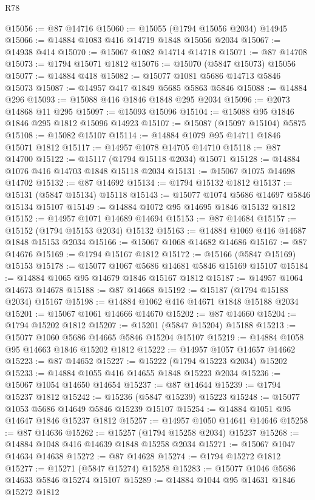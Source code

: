 \begin{lexlean}{R78}
\begin{coremodule}
@15056 := @87 @14716
@15060 := @15055 (@1794 @15056 @2034) @14945
@15066 := @14884 @1083 @416 @14719 @1848 @15056 @2034
@15067 := @14938 @414
@15070 := @15067 @1082 @14714 @14718
@15071 := @87 @14708
@15073 := @1794 @15071 @1812
@15076 := @15070 (@5847 @15073) @15056
@15077 := @14884 @418
@15082 := @15077 @1081 @5686 @14713 @5846 @15073
@15087 := @14957 @417 @1849 @5685 @5863 @5846
@15088 := @14884 @296
@15093 := @15088 @416 @1846 @1848 @295 @2034
@15096 := @2073 @14868 @11 @295
@15097 := @15093 @15096
@15104 := @15088 @95 @1846 @1846 @295 @1812 @15096 @14923
@15107 := @15087 (@15097 @15104) @5875
@15108 := @15082 @15107
@15114 := @14884 @1079 @95 @14711 @1846 @15071 @1812
@15117 := @14957 @1078 @14705 @14710
@15118 := @87 @14700
@15122 := @15117 (@1794 @15118 @2034) @15071
@15128 := @14884 @1076 @416 @14703 @1848 @15118 @2034
@15131 := @15067 @1075 @14698 @14702
@15132 := @87 @14692
@15134 := @1794 @15132 @1812
@15137 := @15131 (@5847 @15134) @15118
@15143 := @15077 @1074 @5686 @14697 @5846 @15134 @15107
@15149 := @14884 @1072 @95 @14695 @1846 @15132 @1812
@15152 := @14957 @1071 @14689 @14694
@15153 := @87 @14684
@15157 := @15152 (@1794 @15153 @2034) @15132
@15163 := @14884 @1069 @416 @14687 @1848 @15153 @2034
@15166 := @15067 @1068 @14682 @14686
@15167 := @87 @14676
@15169 := @1794 @15167 @1812
@15172 := @15166 (@5847 @15169) @15153
@15178 := @15077 @1067 @5686 @14681 @5846 @15169 @15107
@15184 := @14884 @1065 @95 @14679 @1846 @15167 @1812
@15187 := @14957 @1064 @14673 @14678
@15188 := @87 @14668
@15192 := @15187 (@1794 @15188 @2034) @15167
@15198 := @14884 @1062 @416 @14671 @1848 @15188 @2034
@15201 := @15067 @1061 @14666 @14670
@15202 := @87 @14660
@15204 := @1794 @15202 @1812
@15207 := @15201 (@5847 @15204) @15188
@15213 := @15077 @1060 @5686 @14665 @5846 @15204 @15107
@15219 := @14884 @1058 @95 @14663 @1846 @15202 @1812
@15222 := @14957 @1057 @14657 @14662
@15223 := @87 @14652
@15227 := @15222 (@1794 @15223 @2034) @15202
@15233 := @14884 @1055 @416 @14655 @1848 @15223 @2034
@15236 := @15067 @1054 @14650 @14654
@15237 := @87 @14644
@15239 := @1794 @15237 @1812
@15242 := @15236 (@5847 @15239) @15223
@15248 := @15077 @1053 @5686 @14649 @5846 @15239 @15107
@15254 := @14884 @1051 @95 @14647 @1846 @15237 @1812
@15257 := @14957 @1050 @14641 @14646
@15258 := @87 @14636
@15262 := @15257 (@1794 @15258 @2034) @15237
@15268 := @14884 @1048 @416 @14639 @1848 @15258 @2034
@15271 := @15067 @1047 @14634 @14638
@15272 := @87 @14628
@15274 := @1794 @15272 @1812
@15277 := @15271 (@5847 @15274) @15258
@15283 := @15077 @1046 @5686 @14633 @5846 @15274 @15107
@15289 := @14884 @1044 @95 @14631 @1846 @15272 @1812

\end{coremodule}
\end{lexlean}
